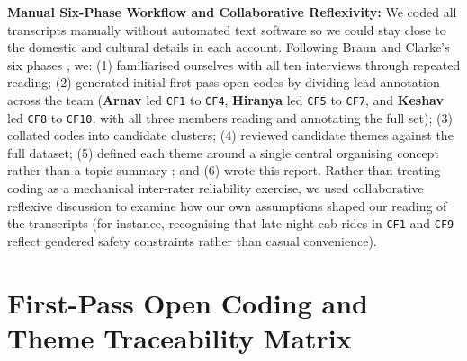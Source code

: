 \documentclass[12pt, a4paper]{article}
\begin{document}
\textbf{Manual Six-Phase Workflow and Collaborative Reflexivity:} We coded all transcripts manually without automated text software so we could stay close to the domestic and cultural details in each account. Following Braun and Clarke's six phases \cite{braun2006, braun2019}, we: (1) familiarised ourselves with all ten interviews through repeated reading; (2) generated initial first-pass open codes by dividing lead annotation across the team (\textbf{Arnav} led \texttt{CF1} to \texttt{CF4}, \textbf{Hiranya} led \texttt{CF5} to \texttt{CF7}, and \textbf{Keshav} led \texttt{CF8} to \texttt{CF10}, with all three members reading and annotating the full set); (3) collated codes into candidate clusters; (4) reviewed candidate themes against the full dataset; (5) defined each theme around a single central organising concept rather than a topic summary \cite{braun2019}; and (6) wrote this report. Rather than treating coding as a mechanical inter-rater reliability exercise, we used collaborative reflexive discussion \cite{braun2019} to examine how our own assumptions shaped our reading of the transcripts (for instance, recognising that late-night cab rides in \texttt{CF1} and \texttt{CF9} reflect gendered safety constraints rather than casual convenience).

\section{First-Pass Open Coding and Theme Traceability Matrix}
\end{document}
